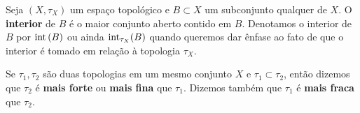  \begin{definition}[Interior]
 Seja 
 $(X, \tau_X)$
 um espaço topológico e
 $B \subset X$
 um subconjunto qualquer de 
 $X$.
 O \textbf{interior} de 
 $B$
 é o maior conjunto aberto contido em
 $B$.
 Denotamos o interior de
 $B$
 por 
 $\operatorname{int} \left({B}\right)$
 ou ainda
 $\operatorname{int}_{\tau_X}(B)$
 quando queremos dar ênfase ao fato de que o interior é tomado
 em relação à topologia
 $\tau_X$.
 \end{definition}
 
 \begin{definition}
 Se
 $\tau_1, \tau_2$
 são duas topologias em um mesmo conjunto
 $X$
 e
 $\tau_1 \subset \tau_2$,
 então dizemos que
 $\tau_2$
 é \textbf{mais forte} ou \textbf{mais fina} que
 $\tau_1$.
 Dizemos também que
 $\tau_1$
 é \textbf{mais fraca} que
 $\tau_2$.
 \end{definition}
 
